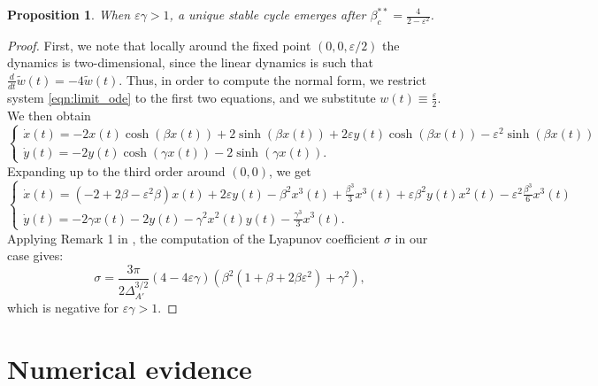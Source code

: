 \documentclass[a4paper,10pt,leqno]{amsart}
\theoremstyle{plain}
\newtheorem{prop}{Proposition}%
\begin{document}
\begin{prop}
When $\varepsilon \gamma > 1$, a unique stable cycle emerges after $\beta^{**}_c= \frac{4}{2-\varepsilon^2}$.
\end{prop}
\begin{proof}
First, we note that locally around the fixed point $(0,0, \varepsilon/2)$ the dynamics is two-dimensional, since the linear dynamics is such that $\frac{d}{dt}\tilde{w}(t) = -4\tilde{w}(t)$. Thus, in order to compute the normal form, we restrict system \eqref{eqn:limit_ode} to the first two equations, and we substitute $w(t) \equiv \frac{\varepsilon}{2}$. We then obtain
\begin{equation}
\begin{cases}
\dot{x}(t) = -2x(t)\cosh{(\beta x(t))} + 2\sinh{(\beta x(t))} + 2\varepsilon y(t) \cosh{(\beta x(t))} - \varepsilon^2 \sinh{(\beta x(t))}\\
\dot{y}(t) = -2y(t) \cosh{(\gamma x(t))} - 2\sinh{(\gamma x(t))}.
\end{cases}
\end{equation}
Expanding up to the third order around $(0,0)$, we get
\begin{equation}
\begin{cases}
\dot{x}(t) = (-2 + 2\beta -\varepsilon^2 \beta)x(t) + 2\varepsilon y(t) - \beta^2 x^3(t) + \frac{\beta^3}{3} x^3(t) + \varepsilon \beta^2 y(t)  x^2(t) - \varepsilon^2 \frac{\beta^3}{6} x^3(t)\\
\dot{y}(t) = - 2\gamma x(t) - 2 y(t) - \gamma^2 x^2(t) y(t) - \frac{\gamma^3}{3} x^3(t) .
\end{cases}
\end{equation}
Applying Remark 1 in \cite[p. 352]{perko}, the computation of the Lyapunov coefficient $\sigma$ in our case gives:
$$
\sigma = \frac{3\pi}{2\Delta_{A'}^{3/2}}(4 - 4\varepsilon \gamma)(\beta^2(1+\beta+2\beta\varepsilon^2) + \gamma^2),
$$
which is negative for $\varepsilon \gamma > 1$.
\end{proof}





\section{Numerical evidence}
\end{document}
